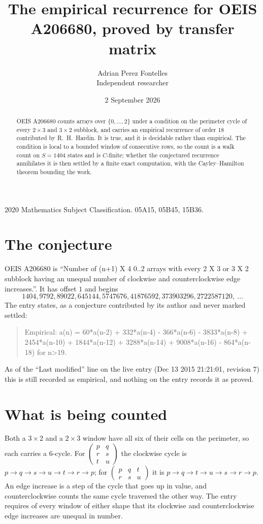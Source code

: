 \documentclass[11pt,a4paper]{article}
\title{The empirical recurrence for OEIS A206680, proved by transfer matrix}
\author{Adrian Perez Fontelles\\ \small Independent researcher}
\date{2 September 2026}
\theoremstyle{plain}
\theoremstyle{definition}
\begin{document}
\maketitle

\begin{abstract}
OEIS A206680 counts arrays over $\{0,\dots,2\}$ under a condition on the perimeter cycle of
every $2\times3$ and $3\times2$ subblock, and carries an empirical recurrence of order $18$ contributed by
R.~H.~Hardin. It is true, and it is decidable rather than empirical. The condition is local to
a bounded window of consecutive rows, so the count is a walk count on $S=1404$ states and is
$C$-finite; whether the conjectured recurrence annihilates it is then settled by a finite exact
computation, with the Cayley--Hamilton theorem bounding the work.
\end{abstract}

\noindent\small 2020 Mathematics Subject Classification. 05A15, 05B45, 15B36.\normalsize

\section{The conjecture}

OEIS A206680 is ``Number of (n+1) X 4 0..2 arrays with every 2 X 3 or 3 X 2 subblock having an unequal number of clockwise and counterclockwise edge increases.''. It has offset $1$ and begins
\[
1404, 9792, 89022, 645144, 5747676, 41876592, 373903296, 2722587120,\ \dots
\]
The entry states, as a conjecture contributed by its author and never marked settled:
\begin{quote}
Empirical: a(n) = 60*a(n-2) + 332*a(n-4) - 366*a(n-6) - 3833*a(n-8) + 2454*a(n-10) + 1844*a(n-12) + 3288*a(n-14) + 9008*a(n-16) - 864*a(n-18) for n>19.
\end{quote}
As of the ``Last modified'' line on the live entry (Dec 13 2015 21:21:01, revision 7) this is still
recorded as empirical, and nothing on the entry records it as proved.

\section{What is being counted}

Both a $3\times2$ and a $2\times3$ window have all six of their cells on the
perimeter, so each carries a $6$-cycle. For
$\begin{pmatrix}p&q\\r&s\\t&u\end{pmatrix}$ the clockwise cycle is
$p\to q\to s\to u\to t\to r\to p$; for
$\begin{pmatrix}p&q&t\\r&s&u\end{pmatrix}$ it is
$p\to q\to t\to u\to s\to r\to p$. An edge increase is a step of the cycle that goes up in
value, and counterclockwise counts the same cycle traversed the other way. The entry requires
of every window of either shape that its clockwise and counterclockwise edge increases are unequal in number.
\end{document}
